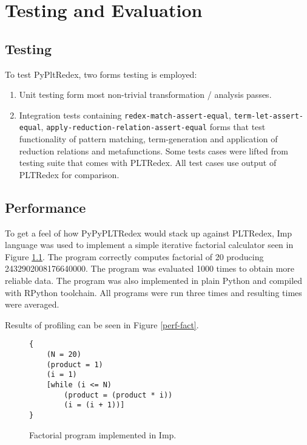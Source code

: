 \chapter{Testing and Evaluation}

\section{Testing}

To test PyPltRedex, two forms testing is employed: 

\begin{enumerate}
\item Unit testing form most non-trivial transformation / analysis passes.
\item Integration tests containing \texttt{redex-match-assert-equal}, \texttt{term-let-assert-equal}, \texttt{apply-reduction-relation-assert-equal} forms that test functionality of pattern matching, term-generation and application of reduction relations and metafunctions. Some tests cases were lifted from testing suite that comes with PLTRedex. All test cases use output of PLTRedex for comparison.
\end{enumerate}

\section{Performance}

To get a feel of how PyPyPLTRedex would stack up against PLTRedex, Imp language was used to implement a simple iterative factorial calculator seen in Figure \ref{imp-factorial}. The program correctly computes factorial of 20 producing 2432902008176640000.  The program was evaluated 1000 times to obtain more reliable data. The program was also implemented in plain Python and compiled with RPython toolchain. All programs were run three times and resulting times were averaged. 

Results of profiling can be seen in Figure \ref{perf-fact}.

\begin{figure}[h]
\begin{verbatim}
{
	(N = 20)
	(product = 1)
	(i = 1)
	[while (i <= N)
		(product = (product * i))
		(i = (i + 1))]
}
\end{verbatim}
\caption{Factorial program implemented in Imp.}
\label{imp-factorial}
\end{figure}

